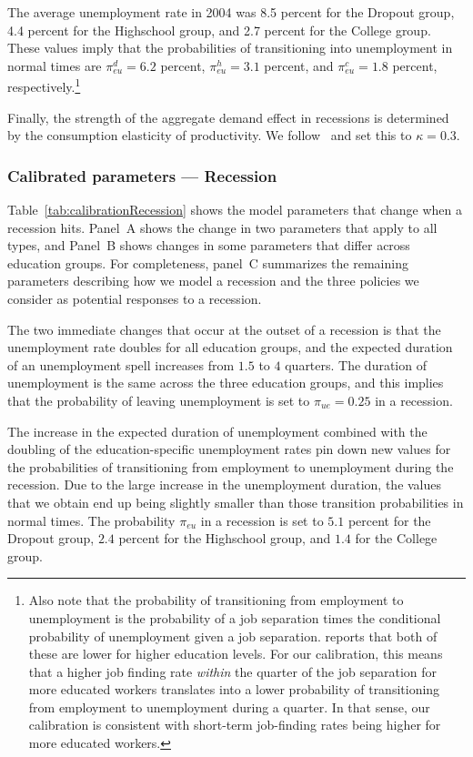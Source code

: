 \documentclass[\PathToRoot/\ProjectName]{subfiles}
\begin{document}
The average unemployment rate in 2004 was 8.5 percent for the Dropout group, 4.4 percent for the Highschool group, and 2.7 percent for the College group.
These values imply that the probabilities of transitioning into unemployment in normal times are $\pi_{eu}^d=6.2$ percent, $\pi_{eu}^h=3.1$ percent, and $\pi_{eu}^c=1.8$ percent, respectively.\footnote{Also note that the probability of transitioning from employment to unemployment is the probability of a job separation times the conditional probability of unemployment given a job separation.
  \cite{mincer1991education} reports that both of these are lower for higher education levels.
  For our calibration, this means that a higher job finding rate \textit{within} the quarter of the job separation for more educated workers translates	into a lower probability of transitioning from employment to unemployment during a quarter.
  In that sense, our calibration is consistent with short-term job-finding rates being higher for more educated workers.}

Finally, the strength of the aggregate demand effect in recessions is determined by the consumption elasticity of productivity.
We follow~\cite{kmpHandbook} and set this to $\kappa=0.3$.

\subsubsection{Calibrated parameters --- Recession}
\whenintegrated{\label{sec:calibRecession}}

Table~\ref{tab:calibrationRecession} shows the model parameters that change when a recession hits. Panel~A shows the change in two parameters that apply to all types, and Panel~B shows changes in some parameters that differ across education groups. For completeness, panel~C summarizes the remaining parameters describing how we model a recession and the three policies we consider as potential responses to a recession.

The two immediate changes that occur at the outset of a recession is that the unemployment rate doubles for all education groups, and the expected duration of an unemployment spell increases from $1.5$ to $4$ quarters. The duration of unemployment is the same across the three education groups, and this implies that the probability of leaving unemployment is set to $\pi_{ue} = 0.25$ in a recession.

The increase in the expected duration of unemployment combined with the doubling of the education-specific unemployment rates pin down new values for the probabilities of transitioning from employment to unemployment during the recession. Due to the large increase in the unemployment duration, the values that we obtain end up being slightly smaller than those transition probabilities in normal times. The probability $\pi_{eu}$ in a recession is set to $5.1$ percent for the Dropout group, $2.4$ percent for the Highschool group, and $1.4$ for the College group.
\end{document}

